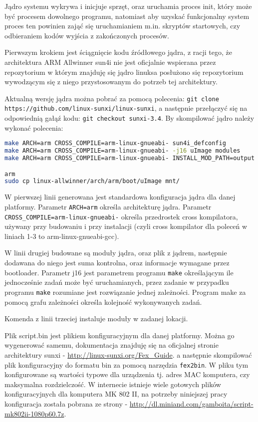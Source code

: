 Jądro systemu wykrywa i inicjuje sprzęt, oraz uruchamia proces init, który może być procesem dowolnego programu, natomiast aby uzyskać funkcjonalny system proces ten powinien zająć się uruchamianiem m.in. skryptów startowych, czy odbieraniem kodów wyjścia z zakończonych procesów.

Pierwszym krokiem jest ściągnięcie kodu źródłowego jądra, z racji tego, że architektura ARM Allwinner sun4i nie jest oficjalnie wspierana przez repozytorium w którym znajduję się jądro linuksa posłużono się repozytorium wywodzącym się z niego przystosowanym do potrzeb tej architektury.

Aktualną wersję jądra można pobrać za pomocą polecenia: \lstinline|git clone https://github.com/linux-sunxi/linux-sunxi|, a następnie przełączyć się na odpowiednią gałąź kodu: \lstinline|git checkout sunxi-3.4|. By skompilować jądro należy wykonać polecenia:

\begin{lstlisting}[language=bash]
make ARCH=arm CROSS_COMPILE=arm-linux-gnueabi- sun4i_defconfig
make ARCH=arm CROSS_COMPILE=arm-linux-gnueabi- -j16 uImage modules
make ARCH=arm CROSS_COMPILE=arm-linux-gnueabi- INSTALL_MOD_PATH=output modules_install

arm
sudo cp linux-allwinner/arch/arm/boot/uImage mnt/
\end{lstlisting}

W pierwszej linii generowana jest standardowa konfiguracja jądra dla danej platformy. Parametr \lstinline|ARCH=arm| określa architekturę jądra. Parametr \lstinline|CROSS_COMPILE=arm-linux-gnueabi-| określa przedrostek cross kompilatora, używany przy budowaniu i przy instalacji (czyli cross kompilator dla poleceń w liniach 1-3 to arm-linux-gnueabi-gcc).

\par

W linii drugiej budowane są moduły jądra, oraz plik z jądrem, następnie dodawana do niego jest suma kontrolna, oraz informacje wymagane przez bootloader. Parametr j16 jest parametrem programu \lstinline|make| określającym ile jednocześnie zadań może być uruchamianych, przez zadanie w przypadku programu \lstinline|make| rozumiane jest rozwiązanie jednej zależności. Program make za pomocą grafu zależności określa kolejność wykonywanych zadań.

\par
Komenda z linii trzeciej instaluje moduły w zadanej lokacji.
\par
Plik script.bin jest plikiem konfiguracyjnym dla danej platformy. Można go wygenerować samemu, dokumentacja znajduję się na oficjalnej stronie architektury sunxi - \url{http://linux-sunxi.org/Fex_Guide}. a następnie skompilować plik konfiguracyjny do formatu bin za pomocą narzędzia \lstinline|fex2bin|. W pliku tym konfigurowane są wartości typowe dla urządzenia tj. adres MAC komputera, czy maksymalna rozdzielczość.  W internecie istnieje wiele gotowych plików konfiguracyjnych dla komputera MK 802 II, na potrzeby niniejszej pracy konfiguracja została pobrana ze strony - \url{http://dl.miniand.com/gamboita/script-mk802ii-1080p60.7z}. 

